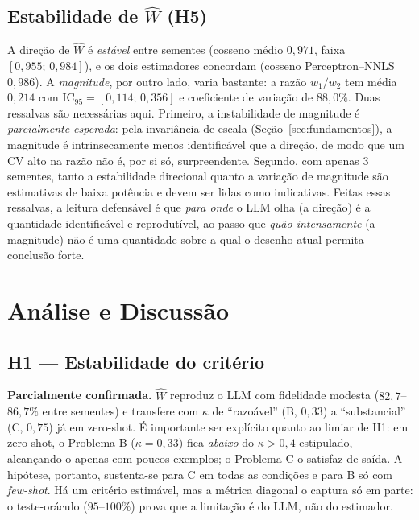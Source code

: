 \documentclass[12pt,a4paper]{article}
\newcommand{\West}{\ensuremath{\hat{W}}}   %
\begin{document}
\subsection{Estabilidade de \West{} (H5)}
\label{sec:res_estabilidade}

A direção de \West{} é \emph{estável} entre sementes (cosseno médio $0{,}971$, faixa
$[0{,}955;\,0{,}984]$), e os dois estimadores concordam (cosseno Perceptron--NNLS
$0{,}986$). A \emph{magnitude}, por outro lado, varia bastante: a razão $w_1/w_2$ tem média
$0{,}214$ com IC$_{95}=[0{,}114;\,0{,}356]$ e coeficiente de variação de $88{,}0\%$. Duas
ressalvas são necessárias aqui. Primeiro, a instabilidade de magnitude é \emph{parcialmente
esperada}: pela invariância de escala (Seção~\ref{sec:fundamentos}), a magnitude é
intrinsecamente menos identificável que a direção, de modo que um CV alto na razão não é, por
si só, surpreendente. Segundo, com apenas $3$ sementes, tanto a estabilidade direcional
quanto a variação de magnitude são estimativas de baixa potência e devem ser lidas como
indicativas. Feitas essas ressalvas, a leitura defensável é que \emph{para onde} o LLM olha
(a direção) é a quantidade identificável e reprodutível, ao passo que \emph{quão
intensamente} (a magnitude) não é uma quantidade sobre a qual o desenho atual permita
conclusão forte.

\section{Análise e Discussão}
\label{sec:discussao}

\subsection{H1 — Estabilidade do critério}
\textbf{Parcialmente confirmada.} \West{} reproduz o LLM com fidelidade modesta
($82{,}7$–$86{,}7\%$ entre sementes) e transfere com $\kappa$ de ``razoável'' (B, $0{,}33$) a
``substancial'' (C, $0{,}75$) já em zero-shot. É importante ser explícito quanto ao limiar de
H1: em zero-shot, o Problema B ($\kappa = 0{,}33$) fica \emph{abaixo} do $\kappa > 0{,}4$
estipulado, alcançando-o apenas com poucos exemplos; o Problema C o satisfaz de saída. A
hipótese, portanto, sustenta-se para C em todas as condições e para B só com \emph{few-shot}.
Há um critério estimável, mas a métrica diagonal o captura só em parte: o teste-oráculo
($95$–$100\%$) prova que a limitação é do LLM, não do estimador.
\end{document}
